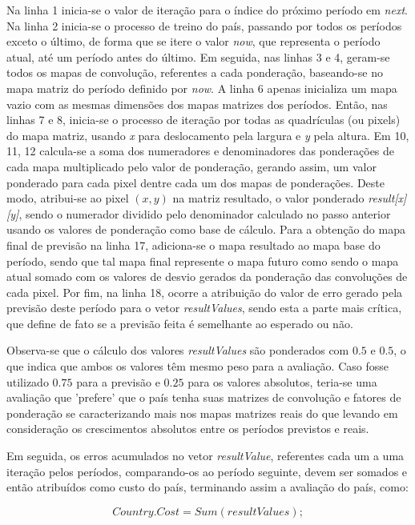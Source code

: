 Na linha 1 inicia-se o valor de iteração para o índice do próximo período em \emph{next}. Na linha 2 inicia-se o processo de treino do país, passando por todos os períodos exceto o último, de forma que se itere o valor \emph{now}, que representa o período atual, até um período antes do último. Em seguida, nas linhas 3 e 4, geram-se todos os mapas de convolução, referentes a cada ponderação, baseando-se no mapa matriz do período definido por \emph{now}. A linha 6 apenas inicializa um mapa vazio com as mesmas dimensões dos mapas matrizes dos períodos. Então, nas linhas 7 e 8, inicia-se o processo de iteração por todas as quadrículas (ou pixels) do mapa matriz, usando \emph{x} para deslocamento pela largura e \emph{y} pela altura. Em 10, 11, 12 calcula-se a soma dos numeradores e denominadores das ponderações de cada mapa multiplicado pelo valor de ponderação, gerando assim, um valor ponderado para cada pixel dentre cada um dos mapas de ponderações. Deste modo, atribui-se ao pixel \(\left(x,y\right)\) na matriz resultado, o valor ponderado \emph{result[x][y]}, sendo o numerador dividido pelo denominador calculado no passo anterior usando os valores de ponderação como base de cálculo. Para a obtenção do mapa final de previsão na linha 17, adiciona-se o mapa resultado ao mapa base do período, sendo que tal mapa final represente o mapa futuro como sendo o mapa atual somado com os valores de desvio gerados da ponderação das convoluções de cada pixel. Por fim, na linha 18, ocorre a atribuição do valor de erro gerado pela previsão deste período para o vetor \emph{resultValues}, sendo esta a parte mais crítica, que define de fato se a previsão feita é semelhante ao esperado ou não.

Observa-se que o cálculo dos valores \emph{resultValues} são ponderados com \(0.5\) e \(0.5\), o que indica que ambos os valores têm mesmo peso para a avaliação. Caso fosse utilizado \(0.75\) para a previsão e \(0.25\) para os valores absolutos, teria-se uma avaliação que 'prefere’ que o país tenha suas matrizes de convolução e fatores de ponderação se caracterizando mais nos mapas matrizes reais do que levando em consideração os crescimentos absolutos entre os períodos previstos e reais. 

Em seguida, os erros acumulados no vetor \emph{resultValue}, referentes cada um a uma iteração pelos períodos, comparando-os ao período seguinte, devem ser somados e então atribuídos como custo do país, terminando assim a avaliação do país, como:

\[Country.Cost = Sum(resultValues);\]

